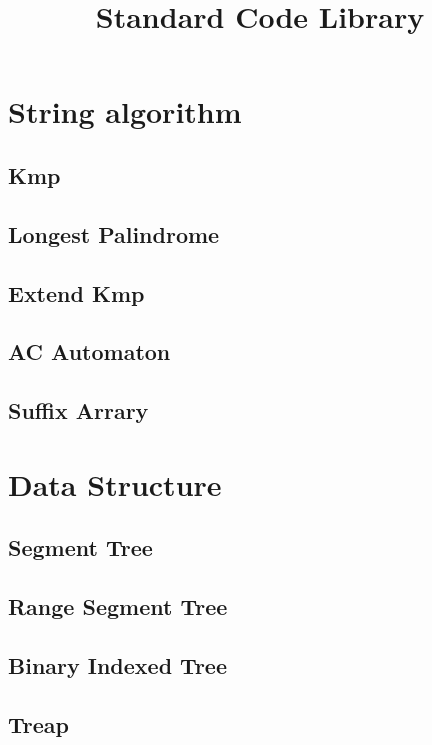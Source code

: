 \documentclass[twoside]{article}
\title{Standard Code Library}
\author{}
\newcommand\blankpage{ \null\thispagestyle{empty}\addtocounter{page}{-1}\newpage }
\begin{document}
	\maketitle
	\afterpage{\blankpage}

	\newpage
	\tableofcontents

	\newpage
	\section{String algorithm}
		\subsection{Kmp}
			
		\subsection{Longest Palindrome}
			
		\subsection{Extend Kmp}
			
		\subsection{AC Automaton}
			
		\subsection{Suffix Arrary}
			
	\newpage
	\section{Data Structure}
		\subsection{Segment Tree}
			
		\subsection{Range Segment Tree}
			
		\subsection{Binary Indexed Tree}
			
		\subsection{Treap}
			
\end{document}
